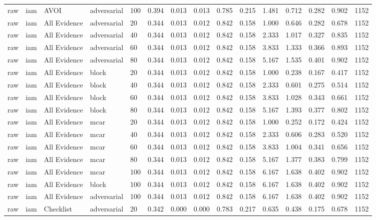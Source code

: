 \begin{table}[!ht]
{\begin{tabular}{lllllllllllllll}
raw & iam & AVOI & adversarial & 100 & 0.394 & 0.013 & 0.013 & 0.785 & 0.215 & 1.481 & 0.712 & 0.282 & 0.902 & 1152 \\
raw & iam & All Evidence & adversarial & 20 & 0.344 & 0.013 & 0.012 & 0.842 & 0.158 & 1.000 & 0.646 & 0.282 & 0.678 & 1152 \\
raw & iam & All Evidence & adversarial & 40 & 0.344 & 0.013 & 0.012 & 0.842 & 0.158 & 2.333 & 1.017 & 0.327 & 0.835 & 1152 \\
raw & iam & All Evidence & adversarial & 60 & 0.344 & 0.013 & 0.012 & 0.842 & 0.158 & 3.833 & 1.333 & 0.366 & 0.893 & 1152 \\
raw & iam & All Evidence & adversarial & 80 & 0.344 & 0.013 & 0.012 & 0.842 & 0.158 & 5.167 & 1.535 & 0.401 & 0.902 & 1152 \\
raw & iam & All Evidence & block & 20 & 0.344 & 0.013 & 0.012 & 0.842 & 0.158 & 1.000 & 0.238 & 0.167 & 0.417 & 1152 \\
raw & iam & All Evidence & block & 40 & 0.344 & 0.013 & 0.012 & 0.842 & 0.158 & 2.333 & 0.601 & 0.275 & 0.514 & 1152 \\
raw & iam & All Evidence & block & 60 & 0.344 & 0.013 & 0.012 & 0.842 & 0.158 & 3.833 & 1.028 & 0.343 & 0.661 & 1152 \\
raw & iam & All Evidence & block & 80 & 0.344 & 0.013 & 0.012 & 0.842 & 0.158 & 5.167 & 1.393 & 0.377 & 0.802 & 1152 \\
raw & iam & All Evidence & mcar & 20 & 0.344 & 0.013 & 0.012 & 0.842 & 0.158 & 1.000 & 0.252 & 0.172 & 0.424 & 1152 \\
raw & iam & All Evidence & mcar & 40 & 0.344 & 0.013 & 0.012 & 0.842 & 0.158 & 2.333 & 0.606 & 0.283 & 0.520 & 1152 \\
raw & iam & All Evidence & mcar & 60 & 0.344 & 0.013 & 0.012 & 0.842 & 0.158 & 3.833 & 1.004 & 0.341 & 0.656 & 1152 \\
raw & iam & All Evidence & mcar & 80 & 0.344 & 0.013 & 0.012 & 0.842 & 0.158 & 5.167 & 1.377 & 0.383 & 0.799 & 1152 \\
raw & iam & All Evidence & mcar & 100 & 0.344 & 0.013 & 0.012 & 0.842 & 0.158 & 6.167 & 1.638 & 0.402 & 0.902 & 1152 \\
raw & iam & All Evidence & block & 100 & 0.344 & 0.013 & 0.012 & 0.842 & 0.158 & 6.167 & 1.638 & 0.402 & 0.902 & 1152 \\
raw & iam & All Evidence & adversarial & 100 & 0.344 & 0.013 & 0.012 & 0.842 & 0.158 & 6.167 & 1.638 & 0.402 & 0.902 & 1152 \\
raw & iam & Checklist & adversarial & 20 & 0.342 & 0.000 & 0.000 & 0.783 & 0.217 & 0.635 & 0.438 & 0.175 & 0.678 & 1152 \\

\end{tabular}}
\end{table}
